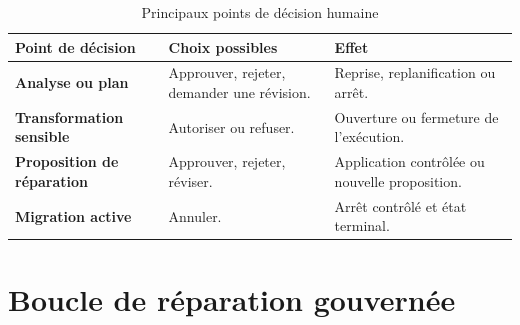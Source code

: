 \begin{table}[H]
    \centering
    \small
    \begin{tabularx}{\textwidth}{|>{\bfseries\RaggedRight\arraybackslash}p{3.4cm}|>{\RaggedRight\arraybackslash}p{4.2cm}|>{\RaggedRight\arraybackslash}X|}
        \hline
        \rowcolor{cgilight!95}
        \textbf{Point de décision} & \textbf{Choix possibles} & \textbf{Effet} \\
        \hline
        Analyse ou plan & Approuver, rejeter, demander une révision. & Reprise, replanification ou arrêt. \\
        \hline
        Transformation sensible & Autoriser ou refuser. & Ouverture ou fermeture de l'exécution. \\
        \hline
        Proposition de réparation & Approuver, rejeter, réviser. & Application contrôlée ou nouvelle proposition. \\
        \hline
        Migration active & Annuler. & Arrêt contrôlé et état terminal. \\
        \hline
    \end{tabularx}
    \caption{Principaux points de décision humaine}
    \label{tab:decisions-humaines-ch3}
\end{table}

\section{Boucle de réparation gouvernée}

